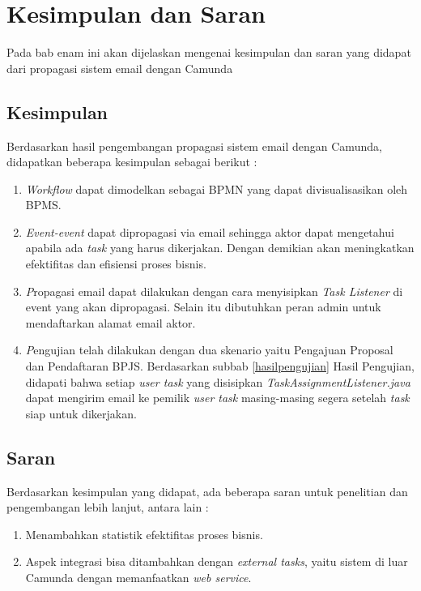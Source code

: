 \chapter{Kesimpulan dan Saran}
\label{chap:kesimpulan_saran}
Pada bab enam ini akan dijelaskan mengenai kesimpulan dan saran yang didapat dari propagasi sistem email dengan Camunda 
\section{Kesimpulan}
\label{sec:kesimpulan}
Berdasarkan hasil pengembangan propagasi sistem email dengan Camunda, didapatkan beberapa kesimpulan sebagai berikut :
\begin{enumerate}
	\item \textit{Workflow} dapat dimodelkan sebagai BPMN yang dapat divisualisasikan oleh BPMS. 
	\item \textit{Event-event} dapat dipropagasi via email sehingga aktor dapat mengetahui apabila ada \textit{task} yang harus dikerjakan. Dengan demikian akan meningkatkan efektifitas dan efisiensi proses bisnis.
	\item \textit Propagasi email dapat dilakukan dengan cara menyisipkan \textit{Task Listener} di event yang akan dipropagasi. Selain itu dibutuhkan peran admin untuk mendaftarkan alamat email aktor.
	\item \textit Pengujian telah dilakukan dengan dua skenario yaitu Pengajuan Proposal dan Pendaftaran BPJS. Berdasarkan subbab \ref{hasilpengujian} Hasil Pengujian, didapati bahwa setiap \textit{user task} yang disisipkan \textit{TaskAssignmentListener.java} dapat mengirim email ke pemilik \textit{user task} masing-masing segera setelah \textit{task} siap untuk dikerjakan.
	

\end{enumerate}

\section{Saran}
\label{sec:saran}
Berdasarkan kesimpulan yang didapat, ada beberapa saran untuk penelitian dan pengembangan lebih lanjut, antara lain :
\begin{enumerate}
	\item Menambahkan statistik efektifitas proses bisnis.
	\item Aspek integrasi bisa ditambahkan dengan \textit{external tasks}, yaitu sistem di luar Camunda dengan memanfaatkan \textit{web service}.
\end{enumerate}